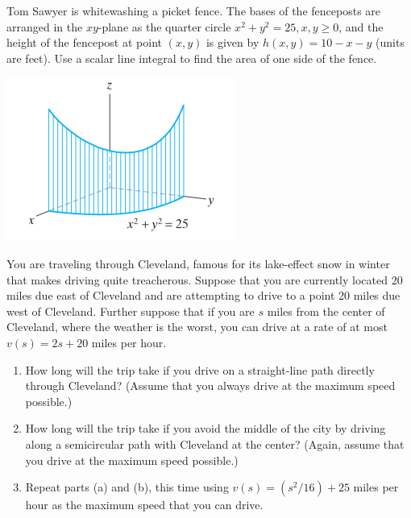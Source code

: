 \documentclass[11pt,letterpaper,boxed]{hmcpset}
\begin{document}
\begin{problem}[Colley 6.1 \#34]
Tom Sawyer is whitewashing a picket fence. The bases of the fenceposts are arranged 
in the $xy$-plane as the quarter circle $x^2+y^2 =25,x,y\geq0$, and the height of the fencepost at point $(x,y)$ is given by $h(x,y)=10-x-y$ (units are feet). Use a scalar line integral 
to find the area of one side of the fence.
\begin{center}
\includegraphics[scale=0.6]{sawyer.png}
\end{center}
\end{problem}

\begin{solution}
\vfill
\end{solution}
\newpage

\begin{problem}[Colley 6.1 \#40]
You are traveling through Cleveland, famous for its lake-effect snow in winter that makes driving quite treacherous. 
Suppose that you are currently located 20 miles due east of Cleveland and are attempting to drive to a 
point 20 miles due west of Cleveland. Further suppose that if you are $s$ miles from the center of Cleveland,
 where the weather is the worst, you can drive at a rate of at most $v(s) = 2s +20$ miles per hour.
 \begin{enumerate}
 \item How long will the trip take if you drive on a straight-line path directly through Cleveland? (Assume that you always drive at the maximum speed possible.)
 \item How long will the trip take if you avoid the middle of the city by driving along a semicircular path with Cleveland at the center? (Again, assume that you drive at the maximum speed possible.)
 \item Repeat parts (a) and (b), this time using $v(s) =
(s^2/16) + 25$ miles per hour as the maximum speed that you can drive.
 \end{enumerate}
\end{problem}
\end{document}
